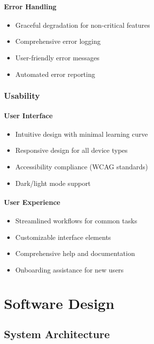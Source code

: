 \documentclass[12pt,a4paper]{report}
\begin{document}
\subsubsection{Error Handling}
\begin{itemize}
   \item Graceful degradation for non-critical features
   \item Comprehensive error logging
   \item User-friendly error messages
   \item Automated error reporting
\end{itemize}

\subsection{Usability}
\subsubsection{User Interface}
\begin{itemize}
   \item Intuitive design with minimal learning curve
   \item Responsive design for all device types
   \item Accessibility compliance (WCAG standards)
   \item Dark/light mode support
\end{itemize}

\subsubsection{User Experience}
\begin{itemize}
   \item Streamlined workflows for common tasks
   \item Customizable interface elements
   \item Comprehensive help and documentation
   \item Onboarding assistance for new users
\end{itemize}

\chapter{Software Design}

\section{System Architecture}
\end{document}

